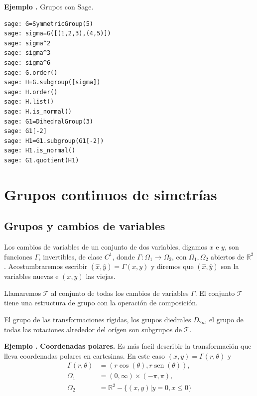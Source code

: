\documentclass{article}
\newcommand{\rr}{\mathbb{R}}
\DeclareMathOperator{\sen}{sen}
\newcounter{ejemplo_cont}
\newenvironment{ejemplo}{\noindent\textbf{Ejemplo  \arabic{ejemplo_cont}.} }{\addtocounter{ejemplo_cont}{1}}
\begin{document}
\begin{ejemplo} Grupos con Sage.
 
\end{ejemplo}

\begin{lstlisting}
sage: G=SymmetricGroup(5)
sage: sigma=G([(1,2,3),(4,5)])
sage: sigma^2
sage: sigma^3
sage: sigma^6
sage: G.order()
sage: H=G.subgroup([sigma])
sage: H.order()
sage: H.list()
sage: H.is_normal()
sage: G1=DihedralGroup(3)
sage: G1[-2]
sage: H1=G1.subgroup(G1[-2])
sage: H1.is_normal()
sage: G1.quotient(H1)
\end{lstlisting}



\section{Grupos continuos de simetrías}

\subsection{Grupos y cambios de variables}

Los cambios de variables de un conjunto de dos variables, digamos $x$ e $y$, son funciones $\Gamma$, invertibles,  de clase $C^1$, donde $\Gamma:\Omega_1\to\Omega_2$, con $\Omega_1,\Omega_2$ abiertos de $\rr^2$.  Acostumbraremos escribir $(\hat{x},\hat{y})=\Gamma(x,y)$ y diremos que $(\hat{x},\hat{y})$ son la variables nuevas e $(x,y)$ las viejas.

 Llamaremos $\mathscr{T}$ al conjunto de todas los cambios de variables $\Gamma$.
El conjunto  $\mathscr{T}$ tiene una estructura de grupo con la operación de composición.

 El grupo de las transformaciones rígidas, los grupos diedrales $D_{2n}$, el grupo de todas las rotaciones alrededor del orígen son subgrupos de  $\mathscr{T}$.




 \begin{ejemplo} \textbf{Coordenadas polares.} Es más facil describir la transformación que lleva coordenadas polares en cartesinas. En este caso $(x,y)=\Gamma(r,\theta)$ y
\[
\begin{array}{ll}
\Gamma(r,\theta)&=(r\cos(\theta),r\sen(\theta)),\\
\Omega_1&=(0,\infty)\times (-\pi,\pi),\\
\Omega_2&=\rr^2-\{(x,y)|y=0,x\leq 0\}\\
\end{array}
\]

 \end{ejemplo}
\end{document}
